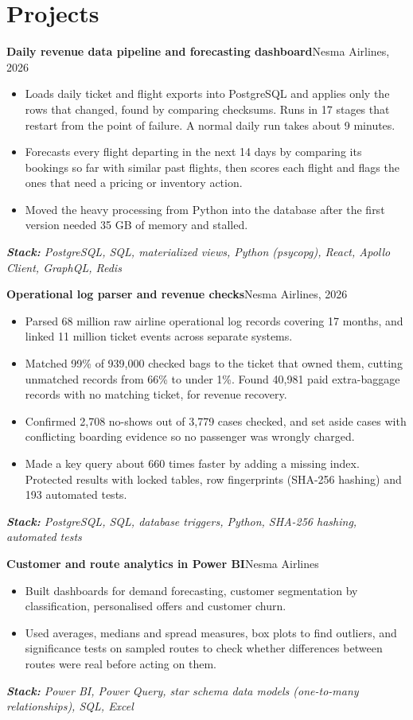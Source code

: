 \documentclass[10pt,a4paper]{article}
\newcommand{\project}[2]{\vspace{4pt}\needspace{3\baselineskip}\textbf{#1}\hfill{\small\color{muted}#2}\par}
\newcommand{\stack}[1]{{\small\itshape\color{muted}\hspace{1.1em}\textbf{Stack:} #1}\par}
\begin{document}
\section{Projects}
\project{Daily revenue data pipeline and forecasting dashboard}{Nesma Airlines, 2026}
\begin{itemize}
  \item Loads daily ticket and flight exports into PostgreSQL and applies only the rows that changed, found by comparing checksums. Runs in 17 stages that restart from the point of failure. A normal daily run takes about 9 minutes.
  \item Forecasts every flight departing in the next 14 days by comparing its bookings so far with similar past flights, then scores each flight and flags the ones that need a pricing or inventory action.
  \item Moved the heavy processing from Python into the database after the first version needed 35 GB of memory and stalled.
\end{itemize}
\stack{PostgreSQL, SQL, materialized views, Python (psycopg), React, Apollo Client, GraphQL, Redis}

\project{Operational log parser and revenue checks}{Nesma Airlines, 2026}
\begin{itemize}
  \item Parsed 68 million raw airline operational log records covering 17 months, and linked 11 million ticket events across separate systems.
  \item Matched 99\% of 939,000 checked bags to the ticket that owned them, cutting unmatched records from 66\% to under 1\%. Found 40,981 paid extra-baggage records with no matching ticket, for revenue recovery.
  \item Confirmed 2,708 no-shows out of 3,779 cases checked, and set aside cases with conflicting boarding evidence so no passenger was wrongly charged.
  \item Made a key query about 660 times faster by adding a missing index. Protected results with locked tables, row fingerprints (SHA-256 hashing) and 193 automated tests.
\end{itemize}
\stack{PostgreSQL, SQL, database triggers, Python, SHA-256 hashing, automated tests}

\project{Customer and route analytics in Power BI}{Nesma Airlines}
\begin{itemize}
  \item Built dashboards for demand forecasting, customer segmentation by classification, personalised offers and customer churn.
  \item Used averages, medians and spread measures, box plots to find outliers, and significance tests on sampled routes to check whether differences between routes were real before acting on them.
\end{itemize}
\stack{Power BI, Power Query, star schema data models (one-to-many relationships), SQL, Excel}
\end{document}
